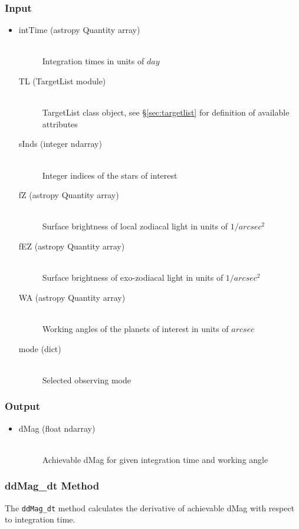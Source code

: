 \documentclass[cleanfoot]{asme2ej}
\begin{document}
\subsubsection*{Input}
\begin{itemize}
\item 
\begin{description}
    \item[intTime (astropy Quantity array)] \hfill \\ Integration times in units of $ day $
    \item[TL (TargetList module)] \hfill \\ TargetList class object, see \S\ref{sec:targetlist} for definition of available attributes
    \item[sInds (integer ndarray)] \hfill \\ Integer indices of the stars of interest
    \item[fZ (astropy Quantity array)] \hfill \\ Surface brightness of local zodiacal light in units of $ 1/arcsec^2 $
    \item[fEZ (astropy Quantity array)] \hfill \\ Surface brightness of exo-zodiacal light in units of $ 1/arcsec^2 $
    \item[WA (astropy Quantity array)] \hfill \\ Working angles of the planets of interest in units of $ arcsec $
    \item[mode (dict)] \hfill \\ Selected observing mode
\end{description}
\end{itemize}

\subsubsection*{Output}
\begin{itemize}
\item 
\begin{description}
    \item[dMag (float ndarray)] \hfill \\ Achievable dMag for given integration time and working angle
\end{description}
\end{itemize}


\subsubsection{ddMag\_dt Method} \label{sec:ddMagdt}
The \verb+ddMag_dt+ method calculates the derivative of achievable dMag with respect to integration time.
\end{document}
